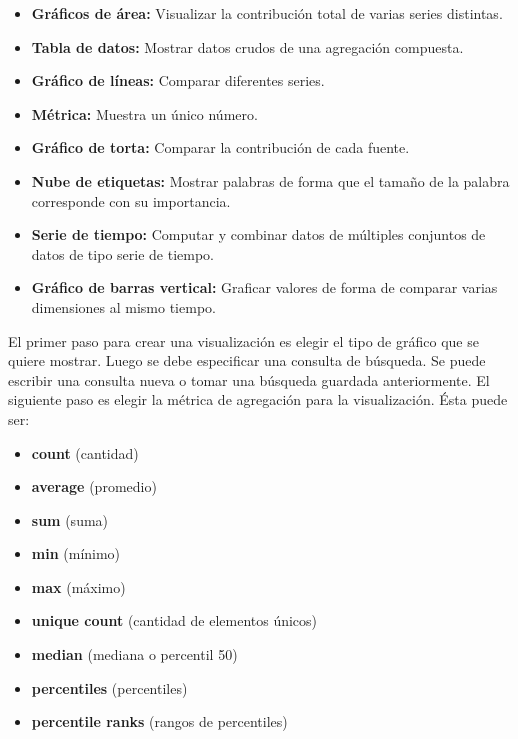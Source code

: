 \begin{itemize}

  \item \textbf{Gráficos de área:}
  Visualizar la contribución total de varias series distintas.

  \item \textbf{Tabla de datos:}
  Mostrar datos crudos de una agregación compuesta.

  \item \textbf{Gráfico de líneas:}
  Comparar diferentes series.

  \item \textbf{Métrica:}
  Muestra un único número.

  \item \textbf{Gráfico de torta:}
  Comparar la contribución de cada fuente.

  \item \textbf{Nube de etiquetas:}
  Mostrar palabras de forma que el tamaño de la palabra corresponde con su importancia.

  \item \textbf{Serie de tiempo:}
  Computar y combinar datos de múltiples conjuntos de datos de tipo serie de tiempo.

  \item \textbf{Gráfico de barras vertical:}
  Graficar valores de forma de comparar varias dimensiones al mismo tiempo.

\end{itemize}


El primer paso para crear una visualización es elegir el tipo de gráfico que se
quiere mostrar. Luego se debe especificar una consulta de búsqueda. Se puede
escribir una consulta nueva o tomar una búsqueda guardada anteriormente. El
siguiente paso es elegir la métrica de agregación para la visualización. Ésta
puede ser:

\begin{itemize}
  \item \textbf{count} (cantidad)
  \item \textbf{average} (promedio)
  \item \textbf{sum} (suma)
  \item \textbf{min} (mínimo)
  \item \textbf{max} (máximo)
  \item \textbf{unique count} (cantidad de elementos únicos)
  \item \textbf{median} (mediana o percentil 50)
  \item \textbf{percentiles} (percentiles)
  \item \textbf{percentile ranks} (rangos de percentiles)
\end{itemize}




